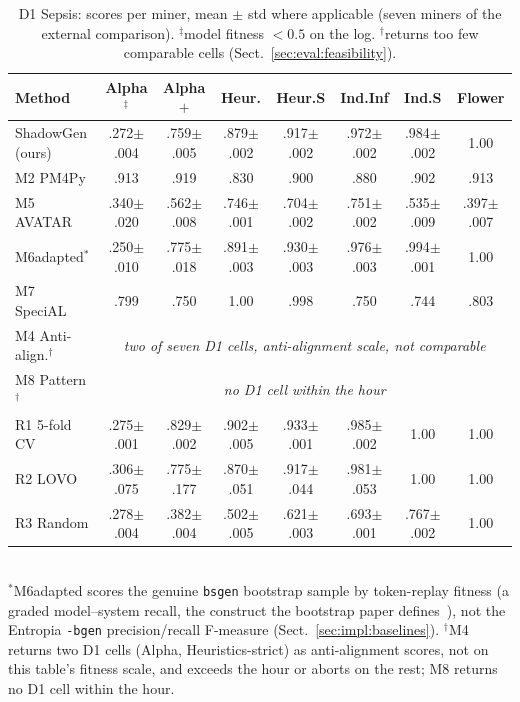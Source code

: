 \documentclass[runningheads]{llncs}
\newcommand{\chg}[1]{\textcolor{chgblue}{#1}}
\begin{document}
\begin{table}[h]
\centering
\caption{D1 Sepsis: scores per miner, mean $\pm$ std where applicable (seven miners of the external comparison). $^{\ddagger}$model fitness $<0.5$ on the log. $^{\dagger}$returns too few comparable cells (Sect.~\ref{sec:eval:feasibility}).}
\label{tab:external}
\setlength{\tabcolsep}{1.6pt}
\scriptsize
\begin{tabular}{@{}lccccccc@{}}
\toprule
Method & Alpha$^{\ddagger}$ & Alpha$+$ & Heur. & Heur.S & Ind.Inf & Ind.S & Flower \\
\midrule
\chg{ShadowGen (ours)} & .272$\pm$.004 & .759$\pm$.005 & .879$\pm$.002 & .917$\pm$.002 & .972$\pm$.002 & .984$\pm$.002 & 1.00 \\
M2 PM4Py & .913 & .919 & .830 & .900 & .880 & .902 & .913 \\
M5 AVATAR & .340$\pm$.020 & .562$\pm$.008 & .746$\pm$.001 & .704$\pm$.002 & .751$\pm$.002 & .535$\pm$.009 & .397$\pm$.007 \\
M6adapted$^{*}$ & .250$\pm$.010 & .775$\pm$.018 & .891$\pm$.003 & .930$\pm$.003 & .976$\pm$.003 & .994$\pm$.001 & 1.00 \\
M7 SpeciAL & .799 & .750 & 1.00 & .998 & .750 & .744 & .803 \\
M4 Anti-align.$^{\dagger}$ & \multicolumn{7}{c}{\emph{two of seven D1 cells, anti-alignment scale, not comparable}} \\
M8 Pattern$^{\dagger}$ & \multicolumn{7}{c}{\emph{no D1 cell within the hour}} \\
\midrule
R1 5-fold CV & .275$\pm$.001 & .829$\pm$.002 & .902$\pm$.005 & .933$\pm$.001 & .985$\pm$.002 & 1.00 & 1.00 \\
R2 LOVO & .306$\pm$.075 & .775$\pm$.177 & .870$\pm$.051 & .917$\pm$.044 & .981$\pm$.053 & 1.00 & 1.00 \\
R3 Random & .278$\pm$.004 & .382$\pm$.004 & .502$\pm$.005 & .621$\pm$.003 & .693$\pm$.001 & .767$\pm$.002 & 1.00 \\
\bottomrule
\end{tabular}\\[2pt]
{\scriptsize $^{*}$M6adapted scores the genuine \texttt{bsgen} bootstrap sample by token-replay fitness (a graded model--system recall, the construct the bootstrap paper defines~\cite{polyvyanyy2022bootstrap}), not the Entropia \texttt{-bgen} precision/recall F-measure (Sect.~\ref{sec:impl:baselines}). $^{\dagger}$M4 returns two D1 cells (Alpha, Heuristics-strict) as anti-alignment scores, not on this table's fitness scale, and exceeds the hour or aborts on the rest; M8 returns no D1 cell within the hour.}
\end{table}



\end{document}
